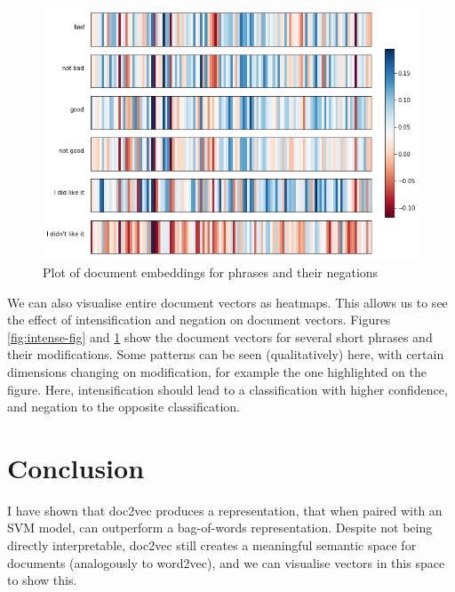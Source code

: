\documentclass[a4paper]{article}
\begin{document}
\begin{multicols}{2}
\begin{figure}
  \centering
  \includegraphics[width=\textwidth,height=\textheight,keepaspectratio]{figs/negate.png}
  \caption{Plot of document embeddings for phrases and their negations}
  \label{fig:negate-fig}
\end{figure}


We can also visualise entire document vectors as heatmaps. This allows us to see the effect of intensification and negation on document vectors. Figures \ref{fig:intense-fig} and \ref{fig:negate-fig} show the document vectors for several short phrases and their modifications. Some patterns can be seen (qualitatively) here, with certain dimensions changing on modification, for example the one highlighted on the figure. Here, intensification should lead to a classification with higher confidence, and negation to the opposite classification.


\section{Conclusion}


I have shown that doc2vec produces a representation, that when paired with an SVM model, can outperform a bag-of-words representation. Despite not being directly interpretable, doc2vec still creates a meaningful semantic space for documents (analogously to word2vec), and we can visualise vectors in this space to show this.

\end{multicols}
\clearpage

\end{document}

